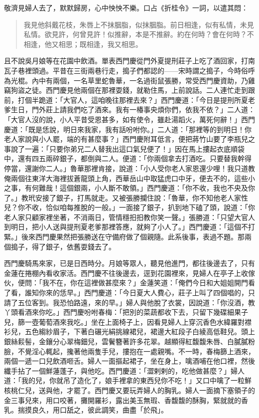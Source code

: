 敬濟見婦人去了，默默歸房，心中怏怏不樂。口占《折桂令》一詞，以遣其悶：
\begin{quote}
我見他斜戴花枝，朱唇上不抹胭脂，似抹胭脂。前日相逢，似有私情，未見私情。欲見許，何曾見許！似推辭，本是不推辭。約在何時？會在何時？不相逢，他又相思；既相逢，我又相思。
\end{quote}

且不說吳月娘等在花園中飲酒。單表西門慶從門外夏提刑莊子上吃了酒回家，打南瓦子巷裡頭過。平昔在三街兩巷行走，搗子們都認的——宋時謂之搗子，今時俗呼為光棍。內中有兩個，一名草里蛇魯華，一名過街鼠張勝，常受西門慶資助，乃雞竊狗盜之徒。西門慶見他兩個在那裡耍錢，就勒住馬，上前說話。二人連忙走到跟前，打個半跪道：「大官人，這咱晚往那裡去來？」西門慶道：「今日是提刑所夏老爹生日，門外莊上請我們吃了酒來。我有一椿事央煩你們，依我不依？」二人道：「大官人沒的說，小人平昔受恩甚多，如有使令，雖赴湯蹈火，萬死何辭！」西門慶道：「既是恁說，明日來我家，我有話吩咐你。」二人道：「那裡等的到明日！你老人家說與小人罷，端的有甚麼事？」西門慶附耳低言，便把蔣竹山要了李瓶兒之事說了一遍：「只要你弟兄二人替我出這口氣兒便了！」因在馬上摟起衣底順袋中，還有四五兩碎銀子，都倒與二人。便道：「你兩個拿去打酒吃。只要替我幹得停當，還謝你二人。」魯華那裡肯接，說道：「小人受你老人家恩還少哩！我只道教俺兩個往東洋大海裡拔蒼龍頭上角，西華岳山中取猛虎口中牙，便去不的，這些小之事，有何難哉！這個銀兩，小人斷不敢領。」西門慶道：「你不收，我也不央及你了。」教玳安接了銀子，打馬就走。又被張勝攔住說：「魯華，你不知他老人家性兒？你不收，恰似咱每推脫的一般。」一面接了銀子，扒到地下磕了頭，說道：「你老人家只顧家裡坐著，不消兩日，管情穩抇抇教你笑一聲。」張勝道：「只望大官人到明日，把小人送與提刑夏老爹那裡答應，就夠了小人了。」西門慶道：「這個不打緊。」後來西門慶果然把張勝送在守備府做了個親隨。此系後事，表過不題。那兩個搗子，得了銀子，依舊耍錢去了。

西門慶騎馬來家，已是日西時分。月娘等眾人，聽見他進門，都往後邊去了，只有金蓮在捲棚內看收家活。西門慶不往後邊去，逕到花園裡來，見婦人在亭子上收傢伙，便問：「我不在，你在這裡做甚麼來？」金蓮笑道：「俺們今日和大姐姐開門看了看，誰知你來的恁早。」西門慶道：「今日夏大人費心，莊子上叫了四個唱的，只請了五位客到。我恐怕路遠，來的早。」婦人與他脫了衣裳，因說道：「你沒酒，教丫頭看酒來你吃。」西門慶吩咐春梅：「把別的菜蔬都收下去，只留下幾碟細果子兒，篩一壺葡萄酒來我吃。」坐在上面椅子上，因看見婦人上穿沉香色水緯羅對襟衫兒，五色縐紗眉子，下著白碾光絹挑線裙兒，裙邊大紅段子白綾高低鞋兒。頭上銀絲鬏髻，金鑲分心翠梅鈿兒，雲鬢簪著許多花翠。越顯得紅馥馥朱唇、白膩膩粉臉，不覺淫心輒起，攙著他兩隻手兒，摟抱在一處親嘴。不一時，春梅篩上酒來，兩個一遞一口兒飲酒咂舌。婦人一面摳起裙子，坐在身上，噙酒哺在他口裡，然後纖手拈了一個鮮蓮蓬子，與他吃。西門慶道：「澀剌剌的，吃他做甚麼？」婦人道：「我的兒，你就吊了造化了，娘手裡拿的東西兒你不吃！」又口中噙了一粒鮮核桃仁兒，送與他，才罷了。西門慶又要玩弄婦人的胸乳。婦人一面摘下塞領子的金三事兒來，用口咬著，攤開羅衫，露出美玉無瑕、香馥馥的酥胸，緊就就的香乳。揣摸良久，用口舐之，彼此調笑，曲盡「於飛」。

